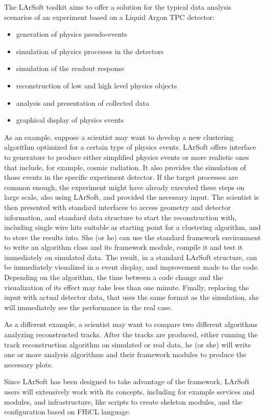 
The LArSoft toolkit aims to offer a solution for the typical data analysis scenarios
of an experiment based on a Liquid Argon TPC detector:
\begin{itemize}
  \item generation of physics pseudo-events
  \item simulation of physics processes in the detectors
  \item simulation of the readout response
  \item reconstruction of low and high level physics objects
  \item analysis and presentation of collected data
  \item graphical display of physics events
\end{itemize}

As an example, suppose a scientist may want to develop a new clustering algorithm
optimized for a certain type of physics events.
LArSoft offers interface to generators to produce either simplified physics events
or more realistic ones that include, for example, cosmic radiation.
It also provides the simulation of those events in the specific experiment detector.
If the target processes are common enough, the experiment might have already
executed these steps on large scale, also using LArSoft, and provided the necessary input.
The scientist is then presented with standard interfaces to access geometry and detector
information, and standard data structure to start the reconstruction with,
including single wire hits suitable as starting point for a clustering algorithm,
and to store the results into.
She (or he) can use the standard framework environment to write an algorithm class
and its framework module, compile it and test it immediately on simulated data.
The result, in a standard LArSoft structure, can be immediately visualized in a
event display, and improvement made to the code.
Depending on the algorithm, the time between a code change and the
visualization of its effect may take less than one minute.
Finally, replacing the input with actual detector data, that uses the same format
as the simulation, she will immediately see the performance in the real case.

As a different example, a scientist may want to compare two different algorithms
analyzing reconstructed tracks.
After the tracks are produced, either running the track reconstruction algorithm
on simulated or real data, he (or she) will write one or more analysis algorithms
and their framework modules to produce the necessary plots.

Since LArSoft has been designed to take advantage of the \ART framework\cite{ART},
LArSoft users will extensively work with its concepts,
including for example services and modules, and infrastructure, like \ART scripts
to create skeleton modules, and the configuration based on FHiCL language\cite{FHiCL}.

